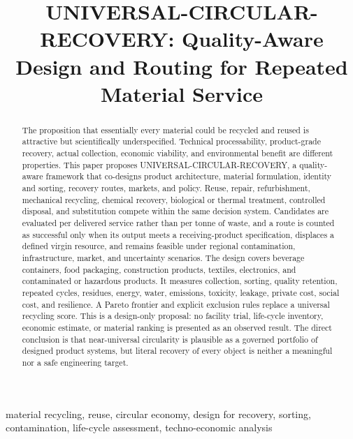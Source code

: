 \documentclass[conference]{IEEEtran}
\begin{document}
\title{UNIVERSAL-CIRCULAR-RECOVERY: Quality-Aware Design and Routing for Repeated Material Service}

\author{
}

\maketitle

\begin{abstract}
The proposition that essentially every material could be recycled and reused is attractive but scientifically underspecified. Technical processability, product-grade recovery, actual collection, economic viability, and environmental benefit are different properties. This paper proposes UNIVERSAL-CIRCULAR-RECOVERY, a quality-aware framework that co-designs product architecture, material formulation, identity and sorting, recovery routes, markets, and policy. Reuse, repair, refurbishment, mechanical recycling, chemical recovery, biological or thermal treatment, controlled disposal, and substitution compete within the same decision system. Candidates are evaluated per delivered service rather than per tonne of waste, and a route is counted as successful only when its output meets a receiving-product specification, displaces a defined virgin resource, and remains feasible under regional contamination, infrastructure, market, and uncertainty scenarios. The design covers beverage containers, food packaging, construction products, textiles, electronics, and contaminated or hazardous products. It measures collection, sorting, quality retention, repeated cycles, residues, energy, water, emissions, toxicity, leakage, private cost, social cost, and resilience. A Pareto frontier and explicit exclusion rules replace a universal recycling score. This is a design-only proposal: no facility trial, life-cycle inventory, economic estimate, or material ranking is presented as an observed result. The direct conclusion is that near-universal circularity is plausible as a governed portfolio of designed product systems, but literal recovery of every object is neither a meaningful nor a safe engineering target.
\end{abstract}

\begin{IEEEkeywords}
material recycling, reuse, circular economy, design for recovery, sorting, contamination, life-cycle assessment, techno-economic analysis
\end{IEEEkeywords}
\end{document}
